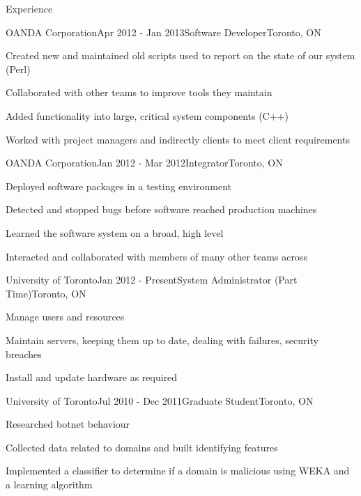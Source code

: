 \documentclass{resume}
\begin{document}
  \begin{rSection}{Experience}
    \begin{rSubsection}{OANDA Corporation}{Apr 2012 - Jan 2013}{Software Developer}{Toronto, ON}
      \item Created new and maintained old scripts used to report on the state of our system (Perl)
      \item Collaborated with other teams to improve tools they maintain
      \item Added functionality into large, critical system components (C++)
      \item Worked with project managers and indirectly clients to meet client requirements
    \end{rSubsection}

    \begin{rSubsection}{OANDA Corporation}{Jan 2012 - Mar 2012}{Integrator}{Toronto, ON}
      \item Deployed software packages in a testing environment
      \item Detected and stopped bugs before software reached production machines
      \item Learned the software system on a broad, high level
      \item Interacted and collaborated with members of many other teams across
    \end{rSubsection}

    \begin{rSubsection}{University of Toronto}{Jan 2012 - Present}{System Administrator (Part Time)}{Toronto, ON}
      \item Manage users and resources
      \item Maintain servers, keeping them up to date, dealing with failures, security breaches
      \item Install and update hardware as required
    \end{rSubsection}

    \begin{rSubsection}{University of Toronto}{Jul 2010 - Dec 2011}{Graduate Student}{Toronto, ON}
      \item Researched botnet behaviour
      \item Collected data related to domains and built identifying features
      \item Implemented a classifier to determine if a domain is malicious using WEKA and a learning algorithm
    \end{rSubsection}


\end{rSection}
\end{document}
